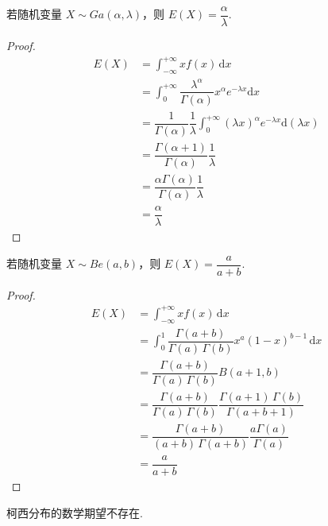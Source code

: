 \begin{conclusion}
    \indent 若随机变量 $X \sim Ga(\alpha,\lambda)$，则 $E(X) = \dfrac{\alpha}{\lambda}$.
\end{conclusion}

\begin{proof}
    $$
    \begin{aligned}
        E(X) &= \int_{-\infty}^{+\infty} x f(x) \, \text{d}x \\
        &= \int_{0}^{+\infty} \dfrac{\lambda^\alpha}{\Gamma(\alpha)} x^\alpha e^{-\lambda x} \text{d}x \\
        &= \dfrac{1}{\Gamma(\alpha)} \dfrac{1}{\lambda} \int_{0}^{+\infty} (\lambda x)^\alpha e^{-\lambda x} \text{d}(\lambda x) \\
        &= \dfrac{\Gamma(\alpha + 1)}{\Gamma(\alpha)} \dfrac{1}{\lambda} \\
        &= \dfrac{\alpha \Gamma(\alpha)}{\Gamma(\alpha)} \dfrac{1}{\lambda} \\
        &= \dfrac{\alpha}{\lambda}
    \end{aligned}
    $$
\end{proof}

\begin{conclusion}
    \indent 若随机变量 $X \sim Be(a,b)$，则 $E(X) = \dfrac{a}{a+b}$.
\end{conclusion}

\begin{proof}
    $$
    \begin{aligned}
        E(X) &= \int_{-\infty}^{+\infty} x f(x) \, \text{d}x \\
        &= \int_{0}^{1} \dfrac{\Gamma(a+b)}{\Gamma(a) \, \Gamma(b)} x^a (1-x)^{b-1} \, \text{d}x \\
        &= \dfrac{\Gamma(a+b)}{\Gamma(a) \, \Gamma(b)} B(a+1,b) \\
        &= \dfrac{\Gamma(a+b)}{\Gamma(a) \, \Gamma(b)} \dfrac{\Gamma(a+1) \, \Gamma(b)}{\Gamma(a+b+1)} \\
        &= \dfrac{\Gamma(a+b)}{(a+b) \, \Gamma(a+b)} \dfrac{a \Gamma(a)}{\Gamma(a)} \\
        &= \dfrac{a}{a+b}
    \end{aligned}
    $$
\end{proof}

\begin{conclusion}
    \indent 柯西分布的数学期望不存在.
\end{conclusion}

